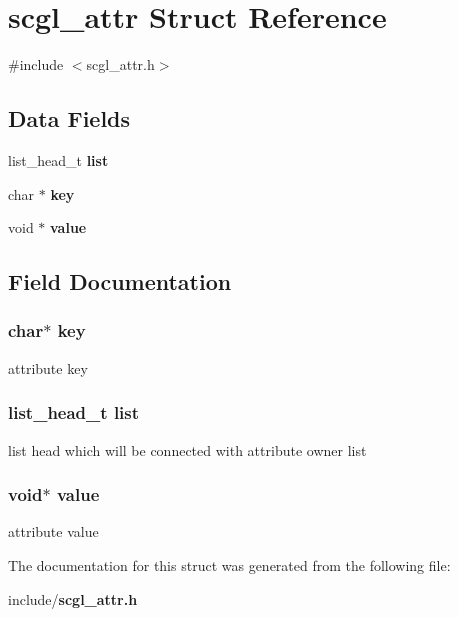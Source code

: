 \section{scgl\-\_\-attr Struct Reference}
\label{structscgl__attr}


{\ttfamily \#include $<$scgl\-\_\-attr.\-h$>$}

\subsection*{Data Fields}
\begin{DoxyCompactItemize}
\item 
list\-\_\-head\-\_\-t {\bf list}
\item 
char $\ast$ {\bf key}
\item 
void $\ast$ {\bf value}
\end{DoxyCompactItemize}


\subsection{Field Documentation}
\subsubsection[{key}]{\setlength{\rightskip}{0pt plus 5cm}char$\ast$ {\bf key}}\label{structscgl__attr_a5892a9181e6a332f84d27aecd41dcd12}
attribute key 
\subsubsection[{list}]{\setlength{\rightskip}{0pt plus 5cm}list\-\_\-head\-\_\-t {\bf list}}\label{structscgl__attr_ab89c0e6c86f3940d2bb4bb87d1a25710}
list head which will be connected with attribute owner list 
\subsubsection[{value}]{\setlength{\rightskip}{0pt plus 5cm}void$\ast$ {\bf value}}\label{structscgl__attr_a0f61d63b009d0880a89c843bd50d8d76}
attribute value 

The documentation for this struct was generated from the following file\-:\begin{DoxyCompactItemize}
\item 
include/{\bf scgl\-\_\-attr.\-h}\end{DoxyCompactItemize}
